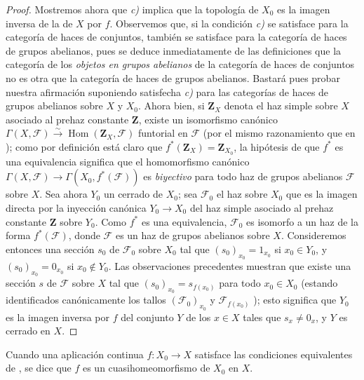 \begin{proof}
Mostremos ahora que \emph{c)} implica que la topología de $X_0$ es la imagen inversa de la de $X$ por $f$.
Observemos que, si la condición \emph{c)} se satisface para la categoría de haces de conjuntos, también se satisface para la categoría de haces de grupos abelianos, pues se deduce inmediatamente de las definiciones  que la categoría de los \emph{objetos en grupos abelianos} de la categoría de haces de conjuntos no es otra que la categoría de haces de grupos abelianos.
Bastará pues probar nuestra afirmación suponiendo satisfecha \emph{c)} para las categorías de haces de grupos abelianos sobre $X$ y $X_0$.
Ahora bien, si $\mathbf Z_X$ denota el haz simple sobre $X$ asociado al prehaz constante $\mathbf Z$, existe un isomorfismo canónico $\Gamma(X,\mathcal F)\xrightarrow{\sim}\operatorname{Hom}(\mathbf Z_X,\mathcal F)$ funtorial en $\mathcal F$ (por el mismo razonamiento que en ); como por definición  está claro que $f^*(\mathbf Z_X)=\mathbf Z_{X_0}$, la hipótesis de que $f^*$ es una equivalencia significa que el homomorfismo canónico $\Gamma(X,\mathcal F)\to\Gamma(X_0,f^*(\mathcal F))$ es \emph{biyectivo} para todo haz de grupos abelianos $\mathcal F$ sobre $X$.
Sea ahora $Y_0$ un cerrado de $X_0$; sea $\mathcal F_0$ el haz sobre $X_0$ que es la imagen directa por la inyección canónica $Y_0\to X_0$ del haz simple asociado al prehaz constante $\mathbf Z$ sobre $Y_0$.
Como $f^*$ es una equivalencia, $\mathcal F_0$ es isomorfo a un haz de la forma $f^*(\mathcal F)$, donde $\mathcal F$ es un haz de grupos abelianos sobre $X$.
Consideremos entonces una sección $s_0$ de $\mathcal F_0$ sobre $X_0$ tal que $(s_0)_{x_0}=1_{x_0}$ si $x_0\in Y_0$, y $(s_0)_{x_0}=0_{x_0}$ si $x_0\notin Y_0$.
Las observaciones precedentes muestran que existe una sección $s$ de $\mathcal F$ sobre $X$ tal que $(s_0)_{x_0}=s_{f(x_0)}$ para todo $x_0\in X_0$ (estando identificados canónicamente los tallos $(\mathcal F_0)_{x_0}$ y $\mathcal F_{f(x_0)}$ ); esto significa que $Y_0$ es la imagen inversa por $f$ del conjunto $Y$ de los $x\in X$ tales que $s_x\neq0_x$, y $Y$ es cerrado en $X$.
\end{proof}

\begin{definition}[10.2.2]
\label{IV.10.2.2}
Cuando una aplicación continua $f:X_0\to X$ satisface las condiciones equivalentes de , se dice que $f$ es un cuasihomeomorfismo de $X_0$ en $X$.
\end{definition}

